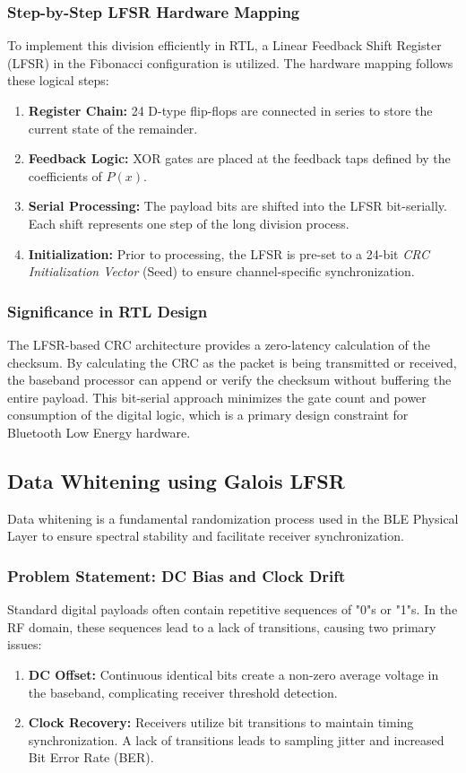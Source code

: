\documentclass[12pt,singleside,a4paper]{report}
\begin{document}
\subsubsection{Step-by-Step LFSR Hardware Mapping}
To implement this division efficiently in RTL, a Linear Feedback Shift Register (LFSR) in the Fibonacci configuration is utilized. The hardware mapping follows these logical steps:
\begin{enumerate}
    \item \textbf{Register Chain:} 24 D-type flip-flops are connected in series to store the current state of the remainder.
    \item \textbf{Feedback Logic:} XOR gates are placed at the feedback taps defined by the coefficients of $P(x)$.
    \item \textbf{Serial Processing:} The payload bits are shifted into the LFSR bit-serially. Each shift represents one step of the long division process.
    \item \textbf{Initialization:} Prior to processing, the LFSR is pre-set to a 24-bit \textit{CRC Initialization Vector} (Seed) to ensure channel-specific synchronization.
\end{enumerate}

\subsubsection{Significance in RTL Design}
The LFSR-based CRC architecture provides a zero-latency calculation of the checksum. By calculating the CRC as the packet is being transmitted or received, the baseband processor can append or verify the checksum without buffering the entire payload. This bit-serial approach minimizes the gate count and power consumption of the digital logic, which is a primary design constraint for Bluetooth Low Energy hardware.

\subsection{Data Whitening using Galois LFSR}

Data whitening is a fundamental randomization process used in the BLE Physical Layer to ensure spectral stability and facilitate receiver synchronization.

\subsubsection{ Problem Statement: DC Bias and Clock Drift}
Standard digital payloads often contain repetitive sequences of "0"s or "1"s. In the RF domain, these sequences lead to a lack of transitions, causing two primary issues:
\begin{enumerate}
    \item \textbf{DC Offset:} Continuous identical bits create a non-zero average voltage in the baseband, complicating receiver threshold detection.
    \item \textbf{Clock Recovery:} Receivers utilize bit transitions to maintain timing synchronization. A lack of transitions leads to sampling jitter and increased Bit Error Rate (BER).
\end{enumerate}
\end{document}
